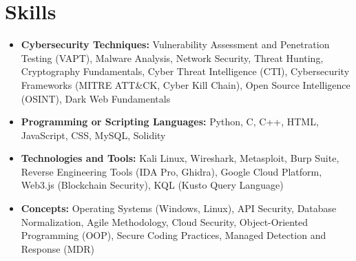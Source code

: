 \documentclass[letterpaper,10pt]{article}
\begin{document}
\section{Skills}
\begin{itemize}[leftmargin=0.15in, label={}, itemsep=4pt, topsep=2pt, parsep=0pt]
  \item \textbf{Cybersecurity Techniques:} Vulnerability Assessment and Penetration Testing (VAPT), Malware Analysis, Network Security, Threat Hunting, Cryptography Fundamentals, Cyber Threat Intelligence (CTI), Cybersecurity Frameworks (MITRE ATT\&CK, Cyber Kill Chain), Open Source Intelligence (OSINT), Dark Web Fundamentals
  \item \textbf{Programming or Scripting Languages:} Python, C, C++, HTML, JavaScript, CSS, MySQL, Solidity
  \item \textbf{Technologies and Tools:} Kali Linux, Wireshark, Metasploit, Burp Suite, Reverse Engineering Tools (IDA Pro, Ghidra), Google Cloud Platform, Web3.js (Blockchain Security), KQL (Kusto Query Language)
  \item \textbf{Concepts:} Operating Systems (Windows, Linux), API Security, Database Normalization, Agile Methodology, Cloud Security, Object-Oriented Programming (OOP), Secure Coding Practices, Managed Detection and Response (MDR)
\end{itemize}
\end{document}
